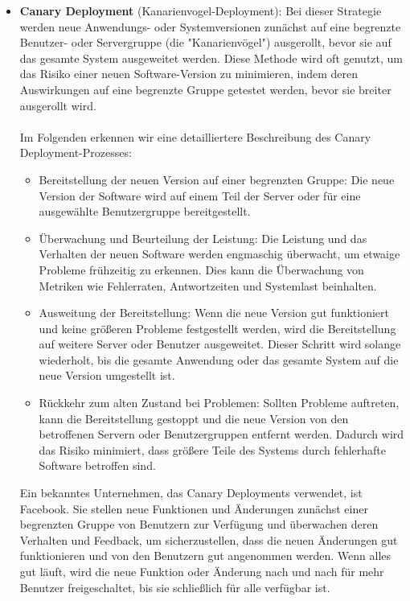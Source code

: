\documentclass[../vs-script-first-v01.tex]{subfiles}
\begin{document}
\begin{itemize}
A/B-Tests (auch als Split-Tests bekannt): Bei dieser Methode wird das Update einer kleinen Gruppe von Benutzern (Gruppe A) zur Verfügung gestellt, während der Rest der Benutzer (Gruppe B) die aktuelle Version der Software verwendet. Dies ermöglicht es, die Auswirkungen des Updates zu testen und Feedback zu sammeln, bevor es auf den Rest der Benutzer ausgerollt wird.
\\\\
Schattenbereitstellung (Shadow Deployment): Bei dieser Methode wird das Update in einer "Schatten"-Umgebung bereitgestellt, die den Produktionsverkehr spiegelt. Dies ermöglicht es, das Verhalten des Updates unter realen Bedingungen zu testen, ohne die Benutzer zu beeinträchtigen.
\item \textbf{Canary Deployment} (Kanarienvogel-Deployment):
Bei dieser Strategie werden neue Anwendungs- oder Systemversionen zunächst auf eine begrenzte Benutzer- oder Servergruppe (die "Kanarienvögel") ausgerollt, bevor sie auf das gesamte System ausgeweitet werden. Diese Methode wird oft genutzt, um das Risiko einer neuen Software-Version zu minimieren, indem deren Auswirkungen auf eine begrenzte Gruppe getestet werden, bevor sie breiter ausgerollt wird.
\\\\
Im Folgenden erkennen wir eine detailliertere Beschreibung des Canary Deployment-Prozesses:
\begin{itemize} 
\item Bereitstellung der neuen Version auf einer begrenzten Gruppe: Die neue Version der Software wird auf einem Teil der Server oder für eine ausgewählte Benutzergruppe bereitgestellt.
\item Überwachung und Beurteilung der Leistung: Die Leistung und das Verhalten der neuen Software werden engmaschig überwacht, um etwaige Probleme frühzeitig zu erkennen. Dies kann die Überwachung von Metriken wie Fehlerraten, Antwortzeiten und Systemlast beinhalten.
\item Ausweitung der Bereitstellung: Wenn die neue Version gut funktioniert und keine größeren Probleme festgestellt werden, wird die Bereitstellung auf weitere Server oder Benutzer ausgeweitet. Dieser Schritt wird solange wiederholt, bis die gesamte Anwendung oder das gesamte System auf die neue Version umgestellt ist.
\item Rückkehr zum alten Zustand bei Problemen: Sollten Probleme auftreten, kann die Bereitstellung gestoppt und die neue Version von den betroffenen Servern oder Benutzergruppen entfernt werden. Dadurch wird das Risiko minimiert, dass größere Teile des Systems durch fehlerhafte Software betroffen sind.
\end{itemize} 
Ein bekanntes Unternehmen, das Canary Deployments verwendet, ist Facebook. Sie stellen neue Funktionen und Änderungen zunächst einer begrenzten Gruppe von Benutzern zur Verfügung und überwachen deren Verhalten und Feedback, um sicherzustellen, dass die neuen Änderungen gut funktionieren und von den Benutzern gut angenommen werden. Wenn alles gut läuft, wird die neue Funktion oder Änderung nach und nach für mehr Benutzer freigeschaltet, bis sie schließlich für alle verfügbar ist.
\end{itemize} 
\end{document}

